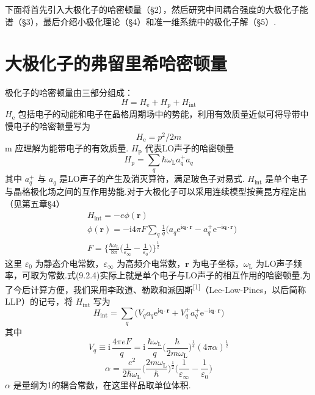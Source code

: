 下面将首先引入大极化子的哈密顿量（§2），然后研究中间耦合强度的大极化子能谱（§3），最后介绍小极化理论（§4）和准一维系统中的极化子解（§5）.

\section{大极化子的弗留里希哈密顿量}

极化子的哈密顿量由三部分组成：
\begin{equation}
  H=H_{\mathrm e}+H_{\mathrm p}+H_{\mathrm{int}}
\end{equation}
$H_{\mathrm e}$ 包括电子的动能和电子在晶格周期场中的势能，利用有效质量近似可将导带中慢电子的哈密顿量写为
\begin{equation}
  H_{\mathrm e}=p^{2}/2m
\end{equation}
m 应理解为能带电子的有效质量. $H_{\mathrm p}$ 代表LO声子的哈密顿量
\begin{equation}
  H_{\mathrm p}=\sum_{q}\hbar\omega_{\mathrm L}a_{q}^{+}a_{q}
\end{equation}
其中 $a_{q}^{+}$ 与 $a_{q}$ 是LO声子的产生及消灭算符，满足玻色子对易式. $H_{\mathrm{int}}$ 是单个电子与晶格极化场之间的互作用势能.对于大极化子可以采用连续模型按黄昆方程定出（见第五章§4）
\begin{equation}
\begin{aligned}
  &H_{\mathrm{int}}=-e\phi(\boldsymbol{r})\\
  &\phi(\boldsymbol{r})=-\mathrm{i}4\pi F
  \sum_{q}\frac{1}{q}\bigl(a_{q}\mathrm{e}^{\mathrm{i}\boldsymbol{q}\cdot\boldsymbol{r}}
  -a_{q}^{+}\mathrm{e}^{-\mathrm{i}\boldsymbol{q}\cdot\boldsymbol{r}}\bigr)\\
  &F=\biggl\{\frac{\hbar\omega_{\mathrm L}}{8\pi}
  \biggl(\frac{1}{\varepsilon_{\infty}}-\frac{1}{\varepsilon_{0}}\biggr)\biggr\}^{\frac{1}{2}}
\end{aligned}
\end{equation}
这里 $\varepsilon_{0}$ 为静态介电常数，$\varepsilon_{\infty}$ 为高频介电常数，$\boldsymbol{r}$ 为电子坐标，$\omega_{\mathrm L}$ 为LO声子频率，可取为常数.式(9.2.4)实际上就是单个电子与LO声子的相互作用的哈密顿量.为了今后计算方便，我们采用李政道、勒欧和派因斯\textsuperscript{[1]}（Lee-Low-Pines，以后简称LLP）的记号，将 $H_{\mathrm{int}}$ 写为
\begin{equation}
  H_{\mathrm{int}}=\sum_{q}\bigl(V_{q}a_{q}\mathrm{e}^{\mathrm{i}\boldsymbol{q}\cdot\boldsymbol{r}}
  +V_{q}^{+}a_{q}^{+}\mathrm{e}^{-\mathrm{i}\boldsymbol{q}\cdot\boldsymbol{r}}\bigr)
\end{equation}
其中
\begin{equation}
  V_{q}\equiv\mathrm{i}\,\frac{4\pi eF}{q}
  =\mathrm{i}\,\frac{\hbar\omega_{\mathrm L}}{q}
  \biggl(\frac{\hbar}{2m\omega_{\mathrm L}}\biggr)^{\frac{1}{4}}
  (4\pi\alpha)^{\frac{1}{2}}
\end{equation}
\begin{equation}
  \alpha=\frac{e^{2}}{2\hbar\omega_{\mathrm L}}
  \biggl(\frac{2m\omega_{\mathrm L}}{\hbar}\biggr)^{\frac{1}{2}}
  \biggl(\frac{1}{\varepsilon_{\infty}}-\frac{1}{\varepsilon_{0}}\biggr)
\end{equation}
$\alpha$ 是量纲为1的耦合常数，在这里样品取单位体积.

